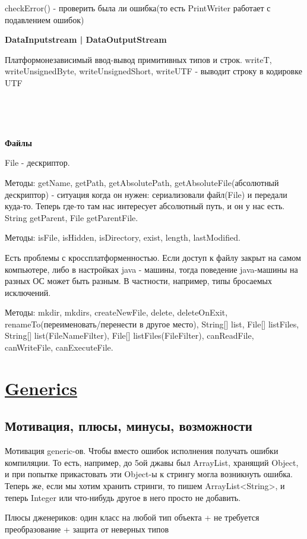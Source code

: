 \documentclass{article}
\begin{document}
checkError() - проверить была ли ошибка(то есть PrintWriter работает с подавлением ошибок)

\textbf{DataInputstream | DataOutputStream}

Платформонезависимый ввод-вывод примитивных типов и строк.
writeT, writeUnsignedByte, writeUnsignedShort, writeUTF - выводит строку в кодировке UTF

~\

~\

\textbf{Файлы}

File - дескриптор.

Методы: getName, getPath, getAbsolutePath, getAbsoluteFile(абсолютный дескриптор) - ситуация когда он нужен: сериализовали файл(File) и передали куда-то. Теперь где-то там нас интересует абсолютный путь, и он у нас есть. String getParent, File getParentFile.

Методы: isFile, isHidden, isDirectory, exist, length, lastModified.

Есть проблемы с кроссплатформенностью. Если доступ к файлу закрыт на самом компьютере, либо в настройках java - машины, тогда поведение java-машины на разных ОС может быть разным. В частности, например, типы бросаемых исключений.

Методы: mkdir, mkdirs, createNewFile, delete, deleteOnExit, renameTo(переименовать/перенести в другое место), String[] list, File[] listFiles, String[] list(FileNameFilter), File[] listFiles(FileFilter), canReadFile, canWriteFile, canExecuteFile.

\section{\underline{Generics}}

\subsection{Мотивация, плюсы, минусы, возможности}

Мотивация generic-ов. Чтобы вместо ошибок исполнения получать ошибки компиляции. То есть, например, до 5ой джавы был ArrayList, хранящий Object, и при попытке прикастовать эти Object-ы к стрингу могла возникнуть ошибка. Теперь же, если мы хотим хранить стринги, то пишем ArrayList<String>, и теперь Integer или что-нибудь другое в него просто не добавить.

Плюсы дженериков: один класс на любой тип объекта + не требуется преобразование + защита от неверных типов
\end{document}

